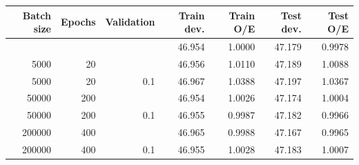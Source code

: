 \addvspace{\baselineskip}
\noindent
\begin{minipage}{\textwidth}
\label{tab:glm_keras_mle_init}
\centering
\small
\setlength{\tabcolsep}{5pt}
\begin{tabular}{rrrrrrr}
\toprule
Batch size & Epochs & Validation & Train dev. & Train O/E & Test dev. & Test O/E \\
\midrule
 &  &  & 46.954 & 1.0000 & 47.179 & 0.9978 \\
5000 & 20 &  & 46.956 & 1.0110 & 47.189 & 1.0088 \\
5000 & 20 & 0.1 & 46.967 & 1.0388 & 47.197 & 1.0367 \\
50000 & 200 &  & 46.954 & 1.0026 & 47.174 & 1.0004 \\
50000 & 200 & 0.1 & 46.955 & 0.9987 & 47.182 & 0.9966 \\
200000 & 400 &  & 46.965 & 0.9988 & 47.167 & 0.9965 \\
200000 & 400 & 0.1 & 46.955 & 1.0028 & 47.183 & 1.0007 \\
\bottomrule
\end{tabular}
\end{minipage}\par
\addvspace{\baselineskip}
